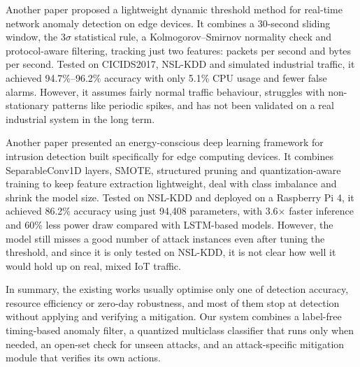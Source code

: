 \documentclass[]{interact}
\theoremstyle{plain}%
\theoremstyle{definition}
\theoremstyle{remark}
\begin{document}
Another paper proposed a lightweight dynamic threshold method for real-time network anomaly detection on edge devices\cite{dynamic_ids2025}. It combines a 30-second sliding window, the 3$\sigma$ statistical rule, a Kolmogorov--Smirnov normality check and protocol-aware filtering, tracking just two features: packets per second and bytes per second. Tested on CICIDS2017, NSL-KDD and simulated industrial traffic, it achieved 94.7\%--96.2\% accuracy with only 5.1\% CPU usage and fewer false alarms. However, it assumes fairly normal traffic behaviour, struggles with non-stationary patterns like periodic spikes, and has not been validated on a real industrial system in the long term.

Another paper presented an energy-conscious deep learning framework for intrusion detection built specifically for edge computing devices\cite{energy_ids2025}. It combines SeparableConv1D layers, SMOTE, structured pruning and quantization-aware training to keep feature extraction lightweight, deal with class imbalance and shrink the model size. Tested on NSL-KDD and deployed on a Raspberry Pi 4, it achieved 86.2\% accuracy using just 94,408 parameters, with 3.6$\times$ faster inference and 60\% less power draw compared with LSTM-based models. However, the model still misses a good number of attack instances even after tuning the threshold, and since it is only tested on NSL-KDD, it is not clear how well it would hold up on real, mixed IoT traffic.

In summary, the existing works usually optimise only one of detection accuracy, resource efficiency or zero-day robustness, and most of them stop at detection without applying and verifying a mitigation. Our system combines a label-free timing-based anomaly filter, a quantized multiclass classifier that runs only when needed, an open-set check for unseen attacks, and an attack-specific mitigation module that verifies its own actions.


\end{document}
